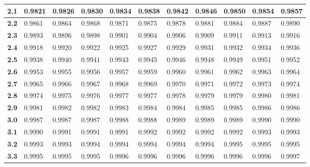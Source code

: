 \begin{alternateColorTable}
\begin{longtable}{|l|l|l|l|l|l|l|l|l|l|l|}
    \textbf{2.1}  & 0.9821  & 0.9826  & 0.9830  & 0.9834  & 0.9838  & 0.9842  & 0.9846  & 0.9850  & 0.9854  & 0.9857\\ \hline
    
    \textbf{2.2}  & 0.9861  & 0.9864  & 0.9868  & 0.9871  & 0.9875  & 0.9878  & 0.9881  & 0.9884  & 0.9887  & 0.9890\\ \hline
    
    \textbf{2.3}  & 0.9893  & 0.9896  & 0.9898  & 0.9901  & 0.9904  & 0.9906  & 0.9909  & 0.9911  & 0.9913  & 0.9916\\ \hline
    
    \textbf{2.4}  & 0.9918  & 0.9920  & 0.9922  & 0.9925  & 0.9927  & 0.9929  & 0.9931  & 0.9932  & 0.9934  & 0.9936\\ \hline
    
    \textbf{2.5}  & 0.9938  & 0.9940  & 0.9941  & 0.9943  & 0.9945  & 0.9946  & 0.9948  & 0.9949  & 0.9951  & 0.9952\\ \hline
    
    \textbf{2.6}  & 0.9953  & 0.9955  & 0.9956  & 0.9957  & 0.9959  & 0.9960  & 0.9961  & 0.9962  & 0.9963  & 0.9964\\ \hline
    
    \textbf{2.7}  & 0.9965  & 0.9966  & 0.9967  & 0.9968  & 0.9969  & 0.9970  & 0.9971  & 0.9972  & 0.9973  & 0.9974\\ \hline
    
    \textbf{2.8}  & 0.9974  & 0.9975  & 0.9976  & 0.9977  & 0.9977  & 0.9978  & 0.9979  & 0.9979  & 0.9980  & 0.9981\\ \hline
    
    \textbf{2.9}  & 0.9981  & 0.9982  & 0.9982  & 0.9983  & 0.9984  & 0.9984  & 0.9985  & 0.9985  & 0.9986  & 0.9986\\ \hline
    
    \textbf{3.0}  & 0.9987  & 0.9987  & 0.9987  & 0.9988  & 0.9988  & 0.9989  & 0.9989  & 0.9989  & 0.9990  & 0.9990\\ \hline
    
    \textbf{3.1}  & 0.9990  & 0.9991  & 0.9991  & 0.9991  & 0.9992  & 0.9992  & 0.9992  & 0.9992  & 0.9993  & 0.9993\\ \hline
    
    \textbf{3.2}  & 0.9993  & 0.9993  & 0.9994  & 0.9994  & 0.9994  & 0.9994  & 0.9994  & 0.9995  & 0.9995  & 0.9995\\ \hline
    
    \textbf{3.3}  & 0.9995  & 0.9995  & 0.9995  & 0.9996  & 0.9996  & 0.9996  & 0.9996  & 0.9996  & 0.9996  & 0.9997\\ \hline
    

\end{longtable}
\end{alternateColorTable}
